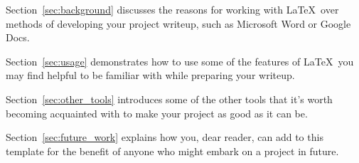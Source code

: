 Section~\ref{sec:background} discusses the reasons for working with \LaTeX\ over methods of
developing your project writeup, such as Microsoft Word or Google Docs.

Section~\ref{sec:usage} demonstrates how to use some of the features of \LaTeX\ you may find helpful
to be familiar with while preparing your writeup.

Section~\ref{sec:other_tools} introduces some of the other tools that it's worth becoming
acquainted with to make your project as good as it can be.

Section~\ref{sec:future_work} explains how you, dear reader, can add to this template for the
benefit of anyone who might embark on a project in future.
